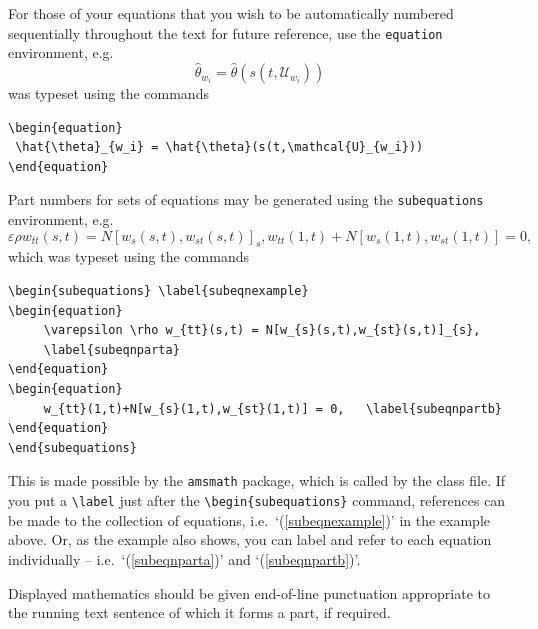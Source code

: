 \documentclass[]{interact}
\theoremstyle{plain}%
\theoremstyle{definition}
\theoremstyle{remark}
\begin{document}
For those of your equations that you wish to be automatically numbered sequentially throughout the text for future reference, use the \texttt{equation} environment, e.g.
\begin{equation}
 \hat{\theta}_{w_i} = \hat{\theta}(s(t,\mathcal{U}_{w_i}))
\end{equation}
was typeset using the commands
\begin{verbatim}
\begin{equation}
 \hat{\theta}_{w_i} = \hat{\theta}(s(t,\mathcal{U}_{w_i}))
\end{equation}
\end{verbatim}

Part numbers for sets of equations may be generated using the \texttt{subequations} environment, e.g.
\begin{subequations} \label{subeqnexample}
\begin{equation}
     \varepsilon \rho w_{tt}(s,t) = N[w_{s}(s,t),w_{st}(s,t)]_{s},
     \label{subeqnparta}
\end{equation}
\begin{equation}
     w_{tt}(1,t)+N[w_{s}(1,t),w_{st}(1,t)] = 0,   \label{subeqnpartb}
\end{equation}
\end{subequations}
which was typeset using the commands
\begin{verbatim}
\begin{subequations} \label{subeqnexample}
\begin{equation}
     \varepsilon \rho w_{tt}(s,t) = N[w_{s}(s,t),w_{st}(s,t)]_{s},
     \label{subeqnparta}
\end{equation}
\begin{equation}
     w_{tt}(1,t)+N[w_{s}(1,t),w_{st}(1,t)] = 0,   \label{subeqnpartb}
\end{equation}
\end{subequations}
\end{verbatim}
This is made possible by the \texttt{amsmath} package, which is called by the class file. If you put a \verb"\label" just after the \verb"\begin{subequations}" command, references can be made to the collection of equations, i.e.\ `(\ref{subeqnexample})' in the example above. Or, as the example also shows, you can label and refer to each equation individually -- i.e.\ `(\ref{subeqnparta})' and `(\ref{subeqnpartb})'.

Displayed mathematics should be given end-of-line punctuation appropriate to the running text sentence of which it forms a part, if required.
\end{document}
